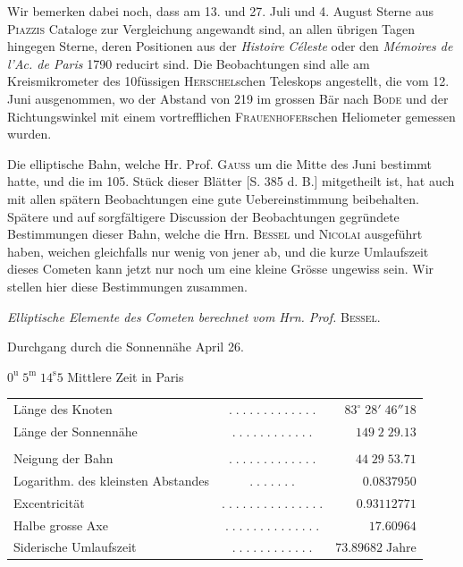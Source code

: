 \par\indent Wir bemerken dabei noch, dass am 13. und 27. Juli und 4. August Sterne aus \textsc{Piazzis} Cataloge
zur Vergleichung angewandt sind, an allen übrigen Tagen hingegen Sterne, deren Positionen aus der
\emph{Histoire Céleste} oder den \emph{Mémoires de l'Ac. de Paris} 1790 reducirt sind. Die Beobachtungen sind alle
am Kreismikrometer des 10füssigen \textsc{Herschel}schen Teleskops angestellt, die vom 12. Juni ausgenommen,
wo der Abstand von 219 im grossen Bär nach \textsc{Bode} und der Richtungswinkel mit einem vortrefflichen
\textsc{Frauenhofer}schen Heliometer gemessen wurden.

\par\indent Die elliptische Bahn, welche Hr. Prof. \textsc{Gauss} um die Mitte des Juni bestimmt hatte, und die im
105. Stück dieser Blätter [S. 385 d. B.] mitgetheilt ist, hat auch mit allen spätern Beobachtungen eine
gute Uebereinstimmung beibehalten. Spätere und auf sorgfältigere Discussion der Beobachtungen gegründete Bestimmungen dieser Bahn, welche die Hrn. \textsc{Bessel} und \textsc{Nicolai} ausgeführt haben, weichen
gleichfalls nur wenig von jener ab, und die kurze Umlaufszeit dieses Cometen kann jetzt nur noch um
eine kleine Grösse ungewiss sein. Wir stellen hier diese Bestimmungen zusammen.

\begin{center}
\emph{Elliptische Elemente des Cometen berechnet vom Hrn. Prof.} \textsc{Bessel.}
\end{center}

\begin{center}\fontsize{10}{12}\selectfont Durchgang durch die Sonnennähe April 26.\par $0^{\mathrm u}\;5^{\mathrm m}\;14^{\mathrm s}5$ Mittlere Zeit in Paris\end{center}
\begin{center}\fontsize{9}{11}\selectfont\setlength{\tabcolsep}{2pt}\renewcommand{\arraystretch}{1.15}\begin{tabular}{lcr}
Länge des Knoten & $.\;.\;.\;.\;.\;.\;.\;.\;.\;.\;.\;.\;.$ & $83^\circ\;28'\;46''18$\\
Länge der Sonnennähe & $.\;.\;.\;.\;.\;.\;.\;.\;.\;.\;.\;.$ & $149\;2\;29.13$\\
\\
Neigung der Bahn & $.\;.\;.\;.\;.\;.\;.\;.\;.\;.\;.\;.\;.$ & $44\;29\;53.71$\\
Logarithm. des kleinsten Abstandes & $.\;.\;.\;.\;.\;.\;.$ & $0.0837950$\\
Excentricität & $.\;.\;.\;.\;.\;.\;.\;.\;.\;.\;.\;.\;.\;.\;.$ & $0.93112771$\\
Halbe grosse Axe & $.\;.\;.\;.\;.\;.\;.\;.\;.\;.\;.\;.\;.\;.$ & $17.60964$\\
Siderische Umlaufszeit & $.\;.\;.\;.\;.\;.\;.\;.\;.\;.\;.\;.$ & $73.89682\;\text{Jahre}$\\
\end{tabular}\end{center}

